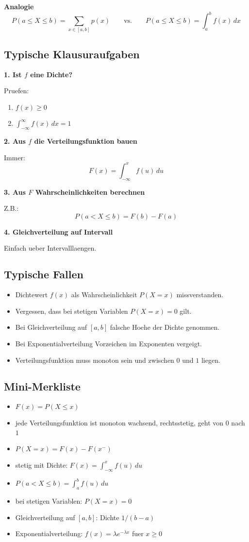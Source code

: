 \documentclass[a4paper,11pt]{article}
\begin{document}
\textbf{Analogie}
\[
P(a\le X\le b)=\sum_{x\in[a,b]} p(x)
\qquad \text{vs.} \qquad
P(a\le X\le b)=\int_a^b f(x)\,dx
\]

\subsection{Typische Klausuraufgaben}
\textbf{1. Ist $f$ eine Dichte?}

Pruefen:
\begin{enumerate}
  \item $f(x)\ge 0$
  \item $\int_{-\infty}^{\infty} f(x)\,dx=1$
\end{enumerate}

\textbf{2. Aus $f$ die Verteilungsfunktion bauen}

Immer:
\[
F(x)=\int_{-\infty}^x f(u)\,du
\]

\textbf{3. Aus $F$ Wahrscheinlichkeiten berechnen}

Z.B.:
\[
P(a<X\le b)=F(b)-F(a)
\]

\textbf{4. Gleichverteilung auf Intervall}

Einfach ueber Intervalllaengen.

\subsection{Typische Fallen}
\begin{itemize}
  \item Dichtewert $f(x)$ als Wahrscheinlichkeit $P(X=x)$ missverstanden.
  \item Vergessen, dass bei stetigen Variablen $P(X=x)=0$ gilt.
  \item Bei Gleichverteilung auf $[a,b]$ falsche Hoehe der Dichte genommen.
  \item Bei Exponentialverteilung Vorzeichen im Exponenten vergeigt.
  \item Verteilungsfunktion muss monoton sein und zwischen $0$ und $1$ liegen.
\end{itemize}

\subsection{Mini-Merkliste}
\begin{itemize}
  \item $\displaystyle F(x)=P(X\le x)$
  \item jede Verteilungsfunktion ist monoton wachsend, rechtsstetig, geht von $0$ nach $1$
  \item $\displaystyle P(X=x)=F(x)-F(x^-)$
  \item stetig mit Dichte: $\displaystyle F(x)=\int_{-\infty}^x f(u)\,du$
  \item $\displaystyle P(a<X\le b)=\int_a^b f(u)\,du$
  \item bei stetigen Variablen: $\displaystyle P(X=x)=0$
  \item Gleichverteilung auf $[a,b]$: Dichte $1/(b-a)$
  \item Exponentialverteilung: $\displaystyle f(x)=\lambda e^{-\lambda x}$ fuer $x\ge 0$
\end{itemize}
\end{document}
